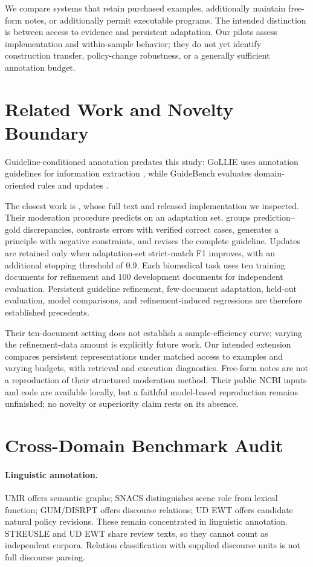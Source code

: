 \documentclass[11pt]{article}
\begin{document}
We compare systems that retain purchased examples, additionally maintain free-form notes, or additionally permit executable programs. The intended distinction is between access to evidence and persistent adaptation. Our pilots assess implementation and within-sample behavior; they do not yet identify construction transfer, policy-change robustness, or a generally sufficient annotation budget.

\section{Related Work and Novelty Boundary}
Guideline-conditioned annotation predates this study: GoLLIE uses annotation guidelines for information extraction \citep{gollie}, while GuideBench evaluates domain-oriented rules and updates \citep{guidebench}.

The closest work is \citet{kim2026refining}, whose full text and released implementation we inspected. Their moderation procedure predicts on an adaptation set, groups prediction--gold discrepancies, contrasts errors with verified correct cases, generates a principle with negative constraints, and revises the complete guideline. Updates are retained only when adaptation-set strict-match F1 improves, with an additional stopping threshold of 0.9. Each biomedical task uses ten training documents for refinement and 100 development documents for independent evaluation. Persistent guideline refinement, few-document adaptation, held-out evaluation, model comparisons, and refinement-induced regressions are therefore established precedents.

Their ten-document setting does not establish a sample-efficiency curve; varying the refinement-data amount is explicitly future work. Our intended extension compares persistent representations under matched access to examples and varying budgets, with retrieval and execution diagnostics. Free-form notes are not a reproduction of their structured moderation method. Their public NCBI inputs and code are available locally, but a faithful model-based reproduction remains unfinished; no novelty or superiority claim rests on its absence.

\section{Cross-Domain Benchmark Audit}
\paragraph{Linguistic annotation.}
UMR offers semantic graphs; SNACS distinguishes scene role from lexical function; GUM/DISRPT offers discourse relations; UD EWT offers candidate natural policy revisions. These remain concentrated in linguistic annotation. STREUSLE and UD EWT share review texts, so they cannot count as independent corpora. Relation classification with supplied discourse units is not full discourse parsing.
\end{document}
